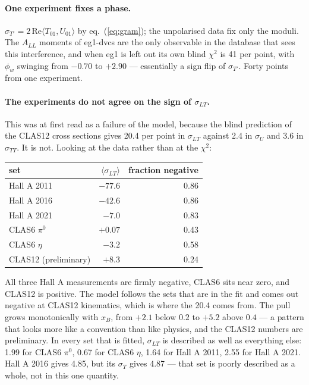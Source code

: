 \documentclass[11pt,a4paper]{article}
\newcommand{\sig}[1]{\sigma_{#1}}
\begin{document}
\paragraph{One experiment fixes a phase.}  $\sig{T'} = 2\,\mathrm{Re}\langle
T_{01}, U_{01}\rangle$ by eq.~(\ref{eq:gram}); the unpolarised data fix only the
moduli.  The $A_{LL}$ moments of eg1-dvcs are the only observable in the
database that sees this interference, and when eg1 is left out its own blind
$\chi^2$ is 41 per point, with $\phi_w$ swinging from $-0.70$ to $+2.90$ ---
essentially a sign flip of $\sig{T'}$.  Forty points from one experiment.

\paragraph{The experiments do not agree on the sign of $\sig{LT}$.}  This was
at first read as a failure of the model, because the blind prediction of the
CLAS12 cross sections gives 20.4 per point in $\sig{LT}$ against 2.4 in
$\sig{U}$ and 3.6 in $\sig{TT}$.  It is not.  Looking at the data rather than
at the $\chi^2$:

\begin{center}
\begin{tabular}{lrr}
\toprule
set & $\langle\sig{LT}\rangle$ & fraction negative\\
\midrule
Hall A 2011 & $-77.6$ & 0.86\\
Hall A 2016 & $-42.6$ & 0.86\\
Hall A 2021 & $-7.0$ & 0.83\\
CLAS6 $\pi^0$ & $+0.07$ & 0.43\\
CLAS6 $\eta$ & $-3.2$ & 0.58\\
CLAS12 (preliminary) & $+8.3$ & 0.24\\
\bottomrule
\end{tabular}
\end{center}

All three Hall A measurements are firmly negative, CLAS6 sits near zero, and
CLAS12 is positive.  The model follows the sets that are in the fit and comes
out negative at CLAS12 kinematics, which is where the 20.4 comes from.  The
pull grows monotonically with $x_B$, from $+2.1$ below $0.2$ to $+5.2$ above
$0.4$ --- a pattern that looks more like a convention than like physics, and
the CLAS12 numbers are preliminary.  In every set that is fitted, $\sig{LT}$ is
described as well as everything else: 1.99 for CLAS6 $\pi^0$, 0.67 for CLAS6
$\eta$, 1.64 for Hall A 2011, 2.55 for Hall A 2021.  Hall A 2016 gives 4.85,
but its $\sig{T}$ gives 4.87 --- that set is poorly described as a whole, not
in this one quantity.
\end{document}
